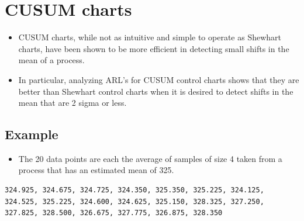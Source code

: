 \documentclass[a4paper,12pt]{article}
\begin{document}
\newpage
\section{CUSUM charts}
\begin{itemize}
\item CUSUM charts, while not as intuitive and simple to operate as Shewhart charts, have been shown to be more efficient in detecting small shifts in the mean of a process. \item In particular, analyzing ARL's for CUSUM control charts shows that they are better than Shewhart control charts when it is desired to detect shifts in the mean that are 2 sigma or less.
\end{itemize}

\subsection{Example}

\begin{itemize}
\item The 20 data points are each the average of samples of size 4 taken from a process that has an estimated mean of 325.
\end{itemize}
\begin{framed}
\begin{verbatim}
324.925, 324.675, 324.725, 324.350, 325.350, 325.225, 324.125,
324.525, 325.225, 324.600, 324.625, 325.150, 328.325, 327.250,
327.825, 328.500, 326.675, 327.775, 326.875, 328.350
\end{verbatim}
\end{framed}
\newpage
\end{document}
